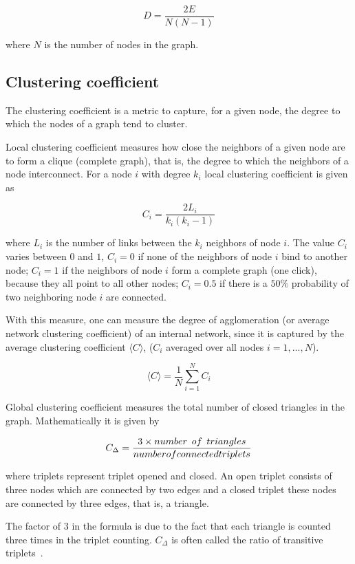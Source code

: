 \documentclass{article}
\begin{document}
\begin{multicols}{2}
$$
D=\frac{2E}{N(N-1)}
$$

where $N$ is the number of nodes in the graph.


\subsection{Clustering coefficient}

The clustering coefficient is a metric to capture, for a given node, the degree to which the nodes of a graph tend to cluster.

Local clustering coefficient measures how close the neighbors of a given node are to form a clique (complete graph), that is, the degree to which the neighbors of a node interconnect. For a node $i$ with degree $k_i$ local clustering coefficient is given as

$$
C_i=\frac{2L_i}{k_i(k_i-1)}
$$

where $L_i$ is the number of links between the $k_i$ neighbors of node $i$. The value $C_i$ varies between $0$ and $1$, $C_i=0$ if none of the neighbors of node $i$ bind to another node; $C_i=1$ if the neighbors of node $i$ form a complete graph (one click), because they all point to all other nodes; $C_i=0.5$ if there is a $50\%$ probability of two neighboring node $i$ are connected.

With this measure, one can measure the degree of agglomeration (or average network clustering coefficient) of an internal network, since it is captured by the average clustering coefficient $\langle C \rangle$, ($C_i$ averaged over all nodes $i=1,...,N$).

$$
\langle C \rangle=\frac{1}{N}\sum\limits_{i=1}^{N}C_i
$$

Global clustering coefficient measures the total number of closed triangles in the graph. Mathematically it is given by

$$
C_{\Delta}=\frac{3\times number\\of\\triangles}{number \\of \\connected \\triplets}
$$

where triplets represent triplet opened and closed. An open triplet consists of three nodes which are connected by two edges and a closed triplet these nodes are connected by three edges, that is, a triangle.

The factor of $3$ in the formula is due to the fact that each triangle is counted three times in the triplet counting. $C_{\Delta}$ is often called the ratio of transitive triplets~\cite{NS}.



\end{multicols}
\end{document}
